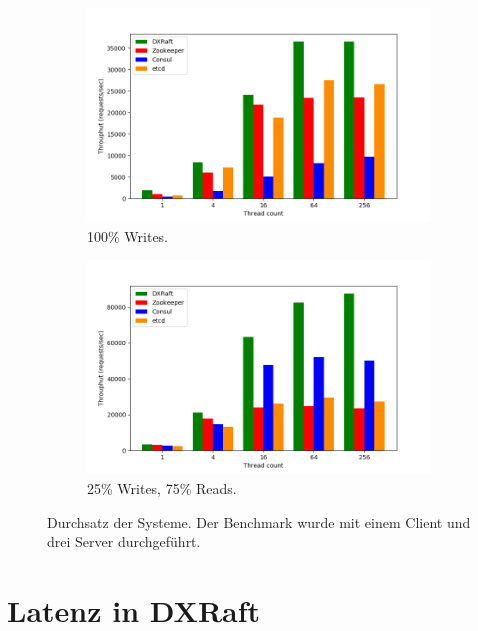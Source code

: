 \begin{figure}[t]
	\centering
	\begin{subfigure}[t]{0.45\textwidth}
		\includegraphics[width=\textwidth]{img/throughput.png}
		\caption{100\% Writes.}
	\end{subfigure}
	\begin{subfigure}[t]{0.45\textwidth}
		\includegraphics[width=\textwidth]{img/throughput2.png}
		\caption{25\% Writes, 75\% Reads.}
	\end{subfigure}
	\caption{Durchsatz der Systeme. Der Benchmark wurde mit einem Client und drei Server durchgeführt.}
	\label{fig:throughput}
\end{figure}


\section{Latenz in DXRaft}
\label{dxraft-latency}

